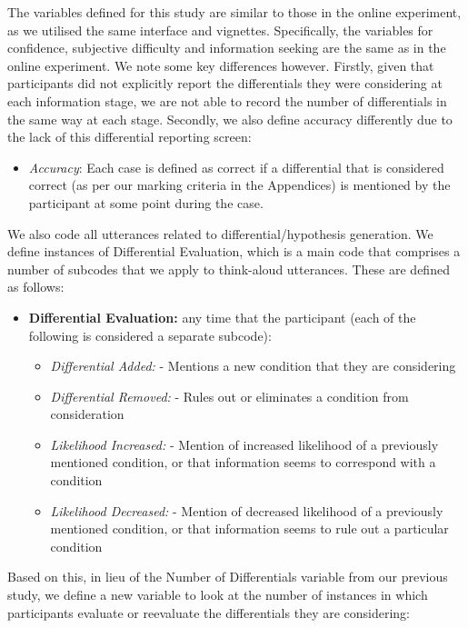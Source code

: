\documentclass[a4paper, nobind]{templates/ociamthesis}
\providecommand{\tightlist}{%
  \setlength{\itemsep}{0pt}\setlength{\parskip}{0pt}}
\begin{document}
The variables defined for this study are similar to those in the online experiment, as we utilised the same interface and vignettes. Specifically, the variables for confidence, subjective difficulty and information seeking are the same as in the online experiment. We note some key differences however. Firstly, given that participants did not explicitly report the differentials they were considering at each information stage, we are not able to record the number of differentials in the same way at each stage. Secondly, we also define accuracy differently due to the lack of this differential reporting screen:\\

\begin{itemize}
\tightlist
\item
  \emph{Accuracy}: Each case is defined as correct if a differential that is considered correct (as per our marking criteria in the Appendices) is mentioned by the participant at some point during the case.
\end{itemize}

We also code all utterances related to differential/hypothesis generation. We define instances of Differential Evaluation, which is a main code that comprises a number of subcodes that we apply to think-aloud utterances. These are defined as follows:

\begin{itemize}
\tightlist
\item
  \textbf{Differential Evaluation:} any time that the participant (each of the following is considered a separate subcode):

  \begin{itemize}
  \tightlist
  \item
    \emph{Differential Added:} - Mentions a new condition that they are considering
  \item
    \emph{Differential Removed:} - Rules out or eliminates a condition from consideration
  \item
    \emph{Likelihood Increased:} - Mention of increased likelihood of a previously mentioned condition, or that information seems to correspond with a condition
  \item
    \emph{Likelihood Decreased:} - Mention of decreased likelihood of a previously mentioned condition, or that information seems to rule out a particular condition
  \end{itemize}
\end{itemize}

\hfill\break
Based on this, in lieu of the Number of Differentials variable from our previous study, we define a new variable to look at the number of instances in which participants evaluate or reevaluate the differentials they are considering:
\end{document}
